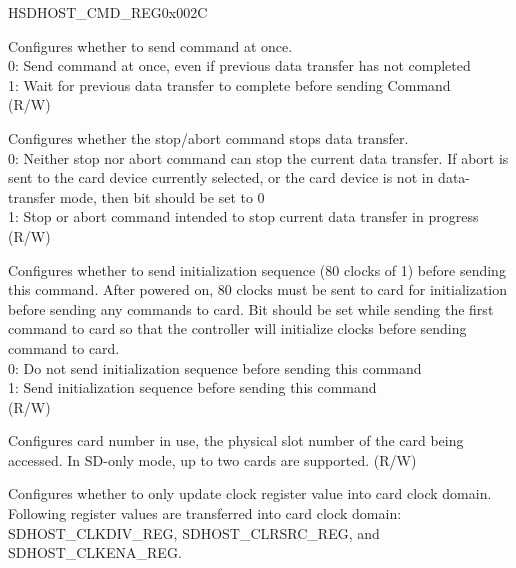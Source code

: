 \addtocounter{Regfloat}{-1}
\begin{register}{H}{SDHOST\_CMD\_REG}{0x002C}
\begin{regdesc}\begin{reglist}
\item [Continued from the previous page...]
\label{fielddesc:SDHOSTWAITPRVDATACOMPLETE}\item [SDHOST\_WAIT\_PRVDATA\_COMPLETE] Configures whether to send command at once.\\0: Send command at once, even if previous data transfer has not completed\\1: Wait for previous data transfer to complete before sending Command\\(R/W)
\label{fielddesc:SDHOSTSTOPABORTCMD}\item [SDHOST\_STOP\_ABORT\_CMD] Configures whether the stop/abort command stops data transfer.\\0: Neither stop nor abort command can stop the current data transfer. If abort is sent to the card device currently selected, or the card device is not in data-transfer mode, then bit should be set to 0\\
1: Stop or abort command intended to stop current data transfer in progress\\(R/W)
\label{fielddesc:SDHOSTSENDINITIALIZATION}\item [SDHOST\_SEND\_INITIALIZATION] Configures whether to send initialization sequence (80 clocks of 1) before sending this command. After powered on, 80 clocks must be sent to card for initialization before sending any commands to card. Bit should be set while sending the first command to card so that the controller will initialize clocks before sending command to card. \\
0: Do not send initialization sequence before sending this command\\
1: Send initialization sequence before sending this command\\
(R/W)
\label{fielddesc:SDHOSTCARDNUMBER}\item [SDHOST\_CARD\_NUMBER] Configures card number in use, the physical slot number of the card being accessed. In SD-only mode, up to two cards are supported. (R/W)
\label{fielddesc:SDHOSTUPDATECLOCKREGISTERSONLY}\item [SDHOST\_UPDATE\_CLOCK\_REGISTERS\_ONLY] Configures whether to only update clock register value into card clock domain. \\
Following register values are transferred into card clock domain: SDHOST\_CLKDIV\_REG, SDHOST\_CLRSRC\_REG, and SDHOST\_CLKENA\_REG.\\

\end{reglist}
\end{regdesc}
\end{register}
